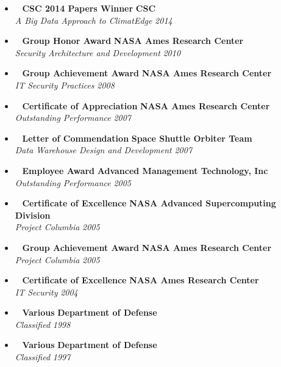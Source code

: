 \begin{itemize}
	\parskip=0.1em
	\item\ 
	\headerrow
		{\textbf{CSC 2014 Papers Winner}}
		{\textbf{CSC}}
	\\
	\headerrow
		{\emph{A Big Data Approach to ClimatEdge\texttrademark}}
		{\emph{2014}}

	\item\ 
	\headerrow
		{\textbf{Group Honor Award}}
		{\textbf{NASA Ames Research Center}}
	\\
	\headerrow
		{\emph{Security Architecture and Development}}
		{\emph{2010}}

	\item\ 
	\headerrow
		{\textbf{Group Achievement Award}}
		{\textbf{NASA Ames Research Center}}
	\\
	\headerrow
		{\emph{IT Security Practices}}
		{\emph{2008}}

	\item\ 
	\headerrow
		{\textbf{Certificate of Appreciation}}
		{\textbf{NASA Ames Research Center}}
	\\
	\headerrow
		{\emph{Outstanding Performance}}
		{\emph{2007}}
	
	\item\ 
	\headerrow
		{\textbf{Letter of Commendation}}
		{\textbf{Space Shuttle Orbiter Team}}
	\\
	\headerrow
		{\emph{Data Warehouse Design and Development}}
		{\emph{2007}}
		
	\item\ 
	\headerrow
		{\textbf{Employee Award}}
		{\textbf{Advanced Management Technology, Inc}}
	\\
	\headerrow
		{\emph{Outstanding Performance}}
		{\emph{2005}}

	\item\ 
	\headerrow
		{\textbf{Certificate of Excellence}}
		{\textbf{NASA Advanced Supercomputing Division}}
	\\
	\headerrow
		{\emph{Project Columbia}}
		{\emph{2005}}

	\item\ 
	\headerrow
		{\textbf{Group Achievement Award}}
		{\textbf{NASA Ames Research Center}}
	\\
	\headerrow
		{\emph{Project Columbia}}
		{\emph{2005}}

	\item\ 
	\headerrow
		{\textbf{Certificate of Excellence}}
		{\textbf{NASA Ames Research Center}}
	\\
	\headerrow
		{\emph{IT Security}}
		{\emph{2004}}

	\item\ 
	\headerrow
		{\textbf{Various}}
		{\textbf{Department of Defense}}
	\\
	\headerrow
		{\emph{Classified}}
		{\emph{1998}}
		\item\ 
	\headerrow
		{\textbf{Various}}
		{\textbf{Department of Defense}}
	\\
	\headerrow
		{\emph{Classified}}
		{\emph{1997}}
		
\end{itemize}

